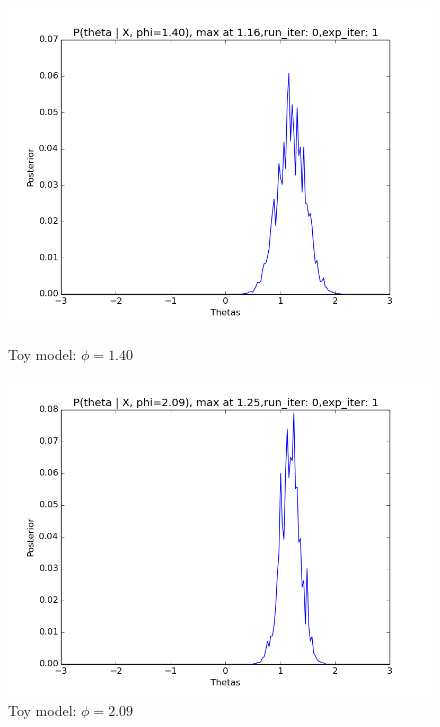 \documentclass[10pt,journal,compsoc]{IEEEtran}
\begin{document}
\begin{figure}
\begin{minipage}[b]{0.5\linewidth}
\includegraphics[width=1\linewidth]{images/LP2.png} 
\caption{\label{fig:LP2}Toy model: $\phi=1.40$}
\end{minipage}%
\begin{minipage}[b]{0.5\linewidth}
\centering
\includegraphics[width=1\linewidth]{images/LP3.png} 
\caption{\label{fig:LP3}Toy model: $\phi=2.09$}
\end{minipage} 
\begin{minipage}[b]{0.5\linewidth}
\centering

\end{minipage}
\end{figure}
\end{document}

